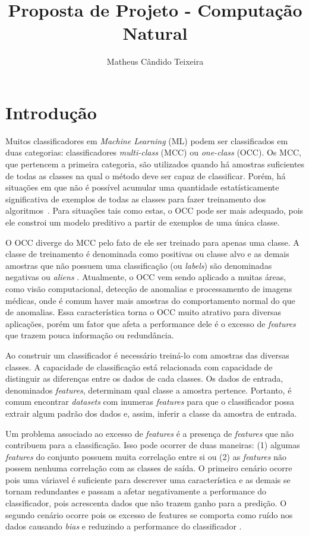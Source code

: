 \documentclass{paper}
\begin{document}
\title{Proposta de Projeto - Computação Natural}
\author{Matheus Cândido Teixeira}
\maketitle

\section{Introdução}
Muitos classificadores em {\itshape Machine Learning} (ML) podem ser
classificados em duas categorias: classificadores \textit{multi-class} (MCC) ou
\textit{one-class} (OCC). Os MCC, que pertencem a primeira categoria, são
utilizados quando há amostras suficientes de todas as classes na qual o método
deve ser capaz de classificar. Porém, há situações em que não é possível
acumular uma quantidade estatísticamente significativa de exemplos de todas as
classes para fazer treinamento dos algoritmos~\cite{Khalifa2016, Khan2014}. Para
situações tais como estas, o OCC pode ser mais adequado, pois ele constroi um
modelo preditivo a partir de exemplos de uma única classe.

O OCC diverge do MCC pelo fato de ele ser treinado para apenas uma classe.  A
classe de treinamento é denominada como positivas ou classe alvo e as demais
amostras que não possuem uma classificação (ou \textit{labels}) são denominadas
negativas ou \textit{aliens} \cite{Khan2014, Perera2019}. Atualmente, o OCC vem
sendo aplicado a muitas áreas, como visão computacional, detecção de anomalias e
processamento de imagens médicas, onde é comum haver mais amostras do
comportamento normal do que de anomalias. Essa característica torna o OCC muito
atrativo para diversas aplicações, porém um fator que afeta a performance dele é
o excesso de \textit{features} que trazem pouca informação ou redundância.

Ao construir um classificador é necessário treiná-lo com amostras das diversas
classes. A capacidade de classificação está relacionada com capacidade de
distinguir as diferenças entre os dados de cada classes. Os dados de entrada,
denominados \textit{features}, determinam qual classe a amostra
pertence. Portanto, é comum encontrar \textit{datasets} com inumeras
\textit{features} para que o classificador possa extrair algum padrão dos dados
e, assim, inferir a classe da amostra de entrada.

Um problema associado ao excesso de \textit{features} é a presença de
\textit{features} que não contribuem para a classificação. Isso pode ocorrer de
duas maneiras: (1) algumas \textit{features} do conjunto possuem muita correlação
entre si ou (2) as \textit{features} não possem nenhuma correlação com as classes de
saída. O primeiro cenário ocorre pois uma váriavel é suficiente para descrever
uma característica e as demais se tornam redundantes e passam a afetar
negativamente a performance do classificador, pois acrescenta dados que não
trazem ganho para a predição. O segundo cenário ocorre pois os excesso de
features se comporta como ruído nos dados causando \textit{bias} e reduzindo a
performance do classificador \cite{Chandrashekar2014, Miao2016, Liu1998,
  Zheng2020}.
\end{document}

